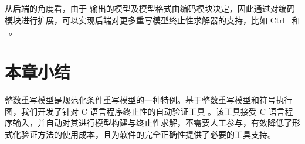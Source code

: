从后端的角度看，由于 \CTerm 输出的模型及模型格式由编码模块决定，因此通过对编码模块进行扩展，可以实现后端对更多重写模型终止性求解器的支持，比如 Ctrl~\cite{DBLP:conf/lpar/Kop015} 和 \TTT~\cite{DBLP:conf/rta/KorpSZM09}。 


\section{本章小结}

整数重写模型是规范化条件重写模型的一种特例。基于整数重写模型和符号执行图，我们开发了针对 C 语言程序终止性的自动验证工具 \CTerm。该工具接受 C 语言程序输入，并自动对其进行模型构建与终止性求解，不需要人工参与，有效降低了形式化验证方法的使用成本，且为软件的完全正确性提供了必要的工具支持。 